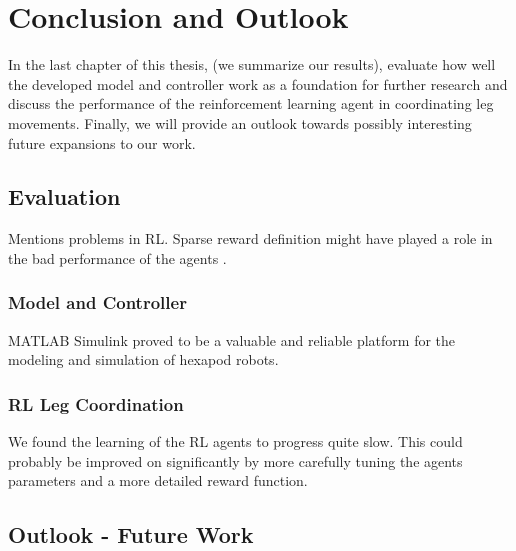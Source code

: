 \chapter{Conclusion and Outlook}
\label{ch:conclusion}

In the last chapter of this thesis, (we summarize our results), evaluate how well the developed model and controller work as a foundation for further research and discuss the performance of the reinforcement learning agent in coordinating leg movements.
Finally, we will provide an outlook towards possibly interesting future expansions to our work.


\section{Evaluation}
Mentions problems in RL.
Sparse reward definition might have played a role in the bad performance of the agents \parencite{matheron2019problem}.




\subsection{Model and Controller}
MATLAB Simulink proved to be a valuable and reliable platform for the modeling and simulation of hexapod robots.

\subsection{RL Leg Coordination}
We found the learning of the RL agents to progress quite slow. 
This could probably be improved on significantly by more carefully tuning the agents parameters and a more detailed reward function.



\section{Outlook - Future Work}




